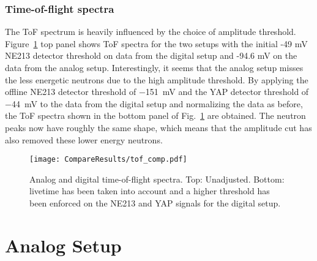 \documentclass[main.tex]{subfiles}
\begin{document}
\subsubsection{Time-of-flight spectra}
The ToF spectrum is heavily influenced by the choice of amplitude threshold. Figure~\ref{fig:tof_comp} top panel shows ToF spectra for the two setups with the initial -49 mV NE213 detector threshold on data from the digital setup and -94.6 mV on the data from the analog setup. Interestingly, it seems that the analog setup misses the less energetic neutrons due to the high amplitude threshold. By applying the offline NE213 detector threshold of \SI{-151}{mV} and the YAP detector threshold of \SI{-44}{mV} to the data from the digital setup and normalizing the data as before, the ToF spectra shown in the bottom panel of Fig.~\ref{fig:tof_comp} are obtained. The neutron peaks now have roughly the same shape, which means that the amplitude cut has also removed these lower energy neutrons.

\begin{figure}[h]
    \centering
        \texttt{[image: CompareResults/tof\_comp.pdf]}
        \caption[Analog and digital time-of-flight spectra.]{Analog and digital time-of-flight spectra. Top: Unadjusted. Bottom: livetime has been taken into account and a higher threshold has been enforced on the NE213 and YAP signals for the digital setup.}
    \label{fig:tof_comp}
\end{figure}

\section{Analog Setup}
\end{document}
